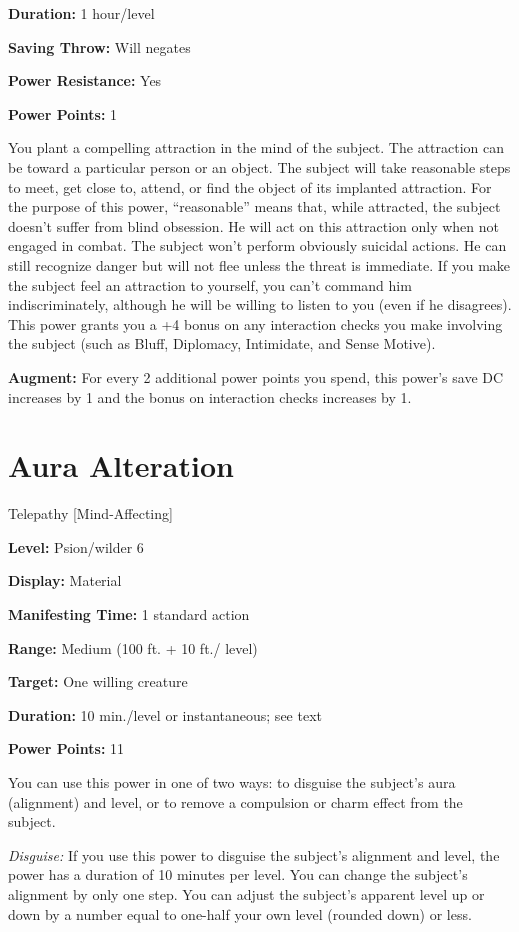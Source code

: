 \documentclass{article}
\begin{document}
\textbf{Duration:} 1 hour/level

\textbf{Saving Throw:} Will negates

\textbf{Power Resistance:} Yes

\textbf{Power Points:} 1

You plant a compelling attraction in the mind of the subject. The attraction can 
be toward a particular person or an object. The subject will take reasonable steps 
to meet, get close to, attend, or find the object of its implanted attraction. 
For the purpose of this power, ``reasonable'' means that, while attracted, the 
subject doesn't suffer from blind obsession. He will act on this attraction only 
when not engaged in combat. The subject won't perform obviously suicidal actions. 
He can still recognize danger but will not flee unless the threat is immediate. 
If you make the subject feel an attraction to yourself, you can't command him indiscriminately, 
although he will be willing to listen to you (even if he disagrees). This power 
grants you a +4 bonus on any interaction checks you make involving the subject 
(such as Bluff, Diplomacy, Intimidate, and Sense Motive).

\textbf{Augment:} For every 2 additional power points you spend, this power's save 
DC increases by 1 and the bonus on interaction checks increases by 1.

\vspace{12pt}
\section*{Aura Alteration}

Telepathy [Mind-Affecting]

\textbf{Level:} Psion/wilder 6

\textbf{Display:} Material

\textbf{Manifesting Time:} 1 standard action

\textbf{Range:} Medium (100 ft. + 10 ft./ level)

\textbf{Target:} One willing creature

\textbf{Duration:} 10 min./level or instantaneous; see text

\textbf{Power Points:} 11

You can use this power in one of two ways: to disguise the subject's aura (alignment) 
and level, or to remove a compulsion or charm effect from the subject.

\textit{Disguise: }If you use this power to disguise the subject's alignment and 
level, the power has a duration of 10 minutes per level. You can change the subject's 
alignment by only one step. You can adjust the subject's apparent level up or down 
by a number equal to one-half your own level (rounded down) or less.
\end{document}

